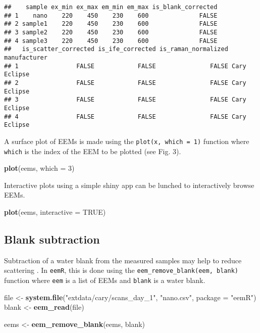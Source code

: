 \documentclass[]{book}
\newenvironment{Shaded}{\begin{snugshade}}{\end{snugshade}}
\newcommand{\KeywordTok}[1]{\textcolor[rgb]{0.13,0.29,0.53}{\textbf{{#1}}}}
\newcommand{\DataTypeTok}[1]{\textcolor[rgb]{0.13,0.29,0.53}{{#1}}}
\newcommand{\DecValTok}[1]{\textcolor[rgb]{0.00,0.00,0.81}{{#1}}}
\newcommand{\StringTok}[1]{\textcolor[rgb]{0.31,0.60,0.02}{{#1}}}
\newcommand{\OtherTok}[1]{\textcolor[rgb]{0.56,0.35,0.01}{{#1}}}
\newcommand{\NormalTok}[1]{{#1}}
\begin{document}
\begin{verbatim}
##    sample ex_min ex_max em_min em_max is_blank_corrected
## 1    nano    220    450    230    600              FALSE
## 2 sample1    220    450    230    600              FALSE
## 3 sample2    220    450    230    600              FALSE
## 4 sample3    220    450    230    600              FALSE
##   is_scatter_corrected is_ife_corrected is_raman_normalized manufacturer
## 1                FALSE            FALSE               FALSE Cary Eclipse
## 2                FALSE            FALSE               FALSE Cary Eclipse
## 3                FALSE            FALSE               FALSE Cary Eclipse
## 4                FALSE            FALSE               FALSE Cary Eclipse
\end{verbatim}

A surface plot of EEMs is made using the \texttt{plot(x,\ which\ =\ 1)}
function where \texttt{which} is the index of the EEM to be plotted (see
Fig. 3).

\begin{Shaded}
\begin{Highlighting}[]
\KeywordTok{plot}\NormalTok{(eems, }\DataTypeTok{which =} \DecValTok{3}\NormalTok{)}
\end{Highlighting}
\end{Shaded}

Interactive plots using a simple shiny app can be lunched to
interactively browse EEMs.

\begin{Shaded}
\begin{Highlighting}[]
\KeywordTok{plot}\NormalTok{(eems, }\DataTypeTok{interactive =} \OtherTok{TRUE}\NormalTok{)}
\end{Highlighting}
\end{Shaded}

\subsection{Blank subtraction}\label{blank-subtraction}

Subtraction of a water blank from the measured samples may help to
reduce scattering \citep{Murphy2013, Stedmon2008}. In \texttt{eemR},
this is done using the \texttt{eem\_remove\_blank(eem,\ blank)} function
where \texttt{eem} is a list of EEMs and \texttt{blank} is a water
blank.

\begin{Shaded}
\begin{Highlighting}[]
\NormalTok{file <-}\StringTok{ }\KeywordTok{system.file}\NormalTok{(}\StringTok{"extdata/cary/scans_day_1"}\NormalTok{, }\StringTok{"nano.csv"}\NormalTok{, }\DataTypeTok{package =} \StringTok{"eemR"}\NormalTok{)}
\NormalTok{blank <-}\StringTok{ }\KeywordTok{eem_read}\NormalTok{(file)}

\NormalTok{eems <-}\StringTok{ }\KeywordTok{eem_remove_blank}\NormalTok{(eems, blank)}
\end{Highlighting}
\end{Shaded}
\end{document}
